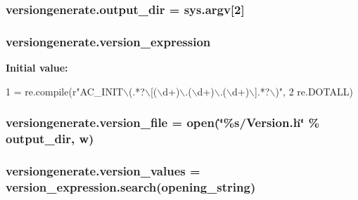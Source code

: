 \subsubsection[{\texorpdfstring{output\+\_\+dir}{output_dir}}]{\setlength{\rightskip}{0pt plus 5cm}versiongenerate.\+output\+\_\+dir = sys.\+argv\mbox{[}2\mbox{]}}\hypertarget{namespaceversiongenerate_aab714e0aa9036025ba7c83eb7422c567}{}\label{namespaceversiongenerate_aab714e0aa9036025ba7c83eb7422c567}
\subsubsection[{\texorpdfstring{version\+\_\+expression}{version_expression}}]{\setlength{\rightskip}{0pt plus 5cm}versiongenerate.\+version\+\_\+expression}\hypertarget{namespaceversiongenerate_a83861e707250395976fdfee3396a0fff}{}\label{namespaceversiongenerate_a83861e707250395976fdfee3396a0fff}
{\bfseries Initial value\+:}
\begin{DoxyCode}
1 = re.compile(\textcolor{stringliteral}{r"AC\_INIT\(\backslash\)(.*?\(\backslash\)[(\(\backslash\)d+)\(\backslash\).(\(\backslash\)d+)\(\backslash\).(\(\backslash\)d+)\(\backslash\)].*?\(\backslash\))"},
2                                 re.DOTALL)
\end{DoxyCode}
\subsubsection[{\texorpdfstring{version\+\_\+file}{version_file}}]{\setlength{\rightskip}{0pt plus 5cm}versiongenerate.\+version\+\_\+file = open(\char`\"{}\%s/Version.\+h\char`\"{} \% output\+\_\+dir, \textquotesingle{}w\textquotesingle{})}\hypertarget{namespaceversiongenerate_a3cb3deeb1538014cd32e4253fe298e27}{}\label{namespaceversiongenerate_a3cb3deeb1538014cd32e4253fe298e27}
\subsubsection[{\texorpdfstring{version\+\_\+values}{version_values}}]{\setlength{\rightskip}{0pt plus 5cm}versiongenerate.\+version\+\_\+values = version\+\_\+expression.\+search({\bf opening\+\_\+string})}\hypertarget{namespaceversiongenerate_a0ce22d4ba772e519b000413a3bf5445c}{}\label{namespaceversiongenerate_a0ce22d4ba772e519b000413a3bf5445c}
